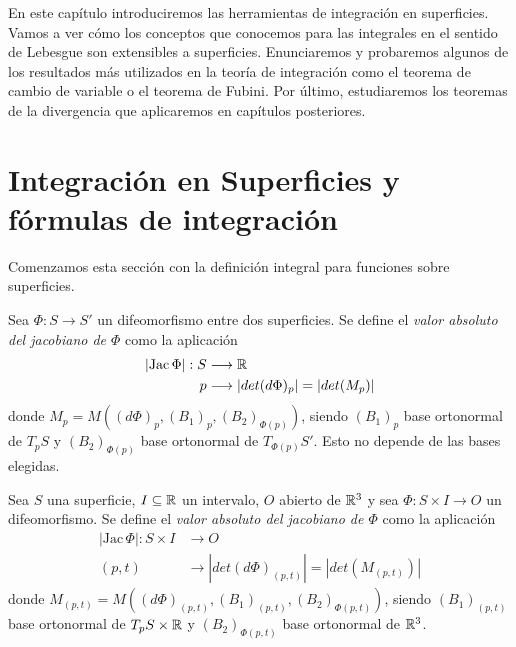 En este capítulo introduciremos las herramientas de integración en superficies. Vamos a ver cómo los conceptos que conocemos para las integrales en el sentido de Lebesgue son extensibles a superficies. Enunciaremos y probaremos algunos de los resultados más utilizados en la teoría de integración como el teorema de cambio de variable o el teorema de Fubini. Por último, estudiaremos los teoremas de la divergencia que aplicaremos en capítulos posteriores.

\section{Integración en Superficies y fórmulas de integración}

Comenzamos esta sección con la definición integral para funciones sobre superficies.

\begin{definition}
Sea $\Phi: S \longrightarrow S'$ un difeomorfismo entre dos superficies. Se define el \textit{valor absoluto del jacobiano de $\Phi$} como la aplicación
\begin{align*}
    |\text{Jac} \, \Phi|: S &\longrightarrow \mathbb{R} \\
    p &\longrightarrow |det(d\Phi)_p| = |det(M_p)|
\end{align*}
%
donde $M_p=M((d\Phi)_p, (B_1)_p, (B_2)_{\Phi(p)})$, siendo $(B_1)_p$ base ortonormal de $T_pS$ y $(B_2)_{\Phi(p)}$ base ortonormal de $T_{\Phi(p)}S'$. Esto no depende de las bases elegidas.
\end{definition}

\begin{definition}
Sea $S$ una superficie, $I \subseteq \mathbb{R}$ un intervalo, $O$ abierto de $\mathbb{R}^3$ y sea $\Phi: S \times I \longrightarrow O$ un difeomorfismo. Se define el \textit{valor absoluto del jacobiano de $\Phi$} como la aplicación
\begin{align*}
    |\text{Jac} \, \Phi|: S \times I &\longrightarrow O \\
    (p,t) &\longrightarrow |det(d\Phi)_{(p,t)}| = |det(M_{(p,t)})|
\end{align*}
%
donde $M_{(p,t)}=M((d\Phi)_{(p,t)}, (B_1)_{(p,t)}, (B_2)_{\Phi(p,t)})$, siendo $(B_1)_{(p,t)}$ base ortonormal de $T_pS \times \mathbb{R}$ y $(B_2)_{\Phi(p,t)}$ base ortonormal de $\mathbb{R}^3$.
\end{definition}

